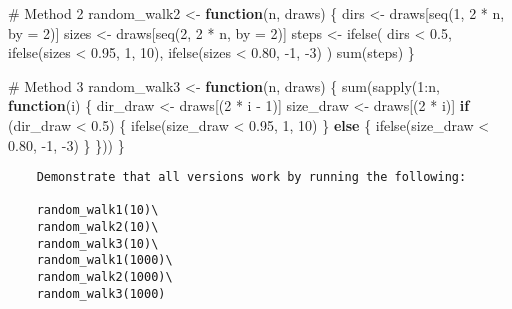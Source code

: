 \documentclass[
  letterpaper,
  DIV=11,
  numbers=noendperiod]{scrartcl}
\newenvironment{Shaded}{\begin{snugshade}}{\end{snugshade}}
\newcommand{\AttributeTok}[1]{\textcolor[rgb]{0.40,0.45,0.13}{#1}}
\newcommand{\CommentTok}[1]{\textcolor[rgb]{0.37,0.37,0.37}{#1}}
\newcommand{\ControlFlowTok}[1]{\textcolor[rgb]{0.00,0.23,0.31}{\textbf{#1}}}
\newcommand{\DecValTok}[1]{\textcolor[rgb]{0.68,0.00,0.00}{#1}}
\newcommand{\FloatTok}[1]{\textcolor[rgb]{0.68,0.00,0.00}{#1}}
\newcommand{\FunctionTok}[1]{\textcolor[rgb]{0.28,0.35,0.67}{#1}}
\newcommand{\NormalTok}[1]{\textcolor[rgb]{0.00,0.23,0.31}{#1}}
\newcommand{\OtherTok}[1]{\textcolor[rgb]{0.00,0.23,0.31}{#1}}
\newcommand{\SpecialCharTok}[1]{\textcolor[rgb]{0.37,0.37,0.37}{#1}}
\begin{document}
\begin{Shaded}
\begin{Highlighting}[]
\CommentTok{\# Method 2}
\NormalTok{random\_walk2 }\OtherTok{\textless{}{-}} \ControlFlowTok{function}\NormalTok{(n, draws) \{}
\NormalTok{  dirs }\OtherTok{\textless{}{-}}\NormalTok{ draws[}\FunctionTok{seq}\NormalTok{(}\DecValTok{1}\NormalTok{, }\DecValTok{2} \SpecialCharTok{*}\NormalTok{ n, }\AttributeTok{by =} \DecValTok{2}\NormalTok{)]}
\NormalTok{  sizes }\OtherTok{\textless{}{-}}\NormalTok{ draws[}\FunctionTok{seq}\NormalTok{(}\DecValTok{2}\NormalTok{, }\DecValTok{2} \SpecialCharTok{*}\NormalTok{ n, }\AttributeTok{by =} \DecValTok{2}\NormalTok{)]}
\NormalTok{  steps }\OtherTok{\textless{}{-}} \FunctionTok{ifelse}\NormalTok{(}
\NormalTok{    dirs }\SpecialCharTok{\textless{}} \FloatTok{0.5}\NormalTok{,}
    \FunctionTok{ifelse}\NormalTok{(sizes }\SpecialCharTok{\textless{}} \FloatTok{0.95}\NormalTok{, }\DecValTok{1}\NormalTok{, }\DecValTok{10}\NormalTok{),}
    \FunctionTok{ifelse}\NormalTok{(sizes }\SpecialCharTok{\textless{}} \FloatTok{0.80}\NormalTok{, }\SpecialCharTok{{-}}\DecValTok{1}\NormalTok{, }\SpecialCharTok{{-}}\DecValTok{3}\NormalTok{)}
\NormalTok{  )}
  \FunctionTok{sum}\NormalTok{(steps)}
\NormalTok{\}}

\CommentTok{\# Method 3}
\NormalTok{random\_walk3 }\OtherTok{\textless{}{-}} \ControlFlowTok{function}\NormalTok{(n, draws) \{}
  \FunctionTok{sum}\NormalTok{(}\FunctionTok{sapply}\NormalTok{(}\DecValTok{1}\SpecialCharTok{:}\NormalTok{n, }\ControlFlowTok{function}\NormalTok{(i) \{}
\NormalTok{    dir\_draw }\OtherTok{\textless{}{-}}\NormalTok{ draws[(}\DecValTok{2} \SpecialCharTok{*}\NormalTok{ i }\SpecialCharTok{{-}} \DecValTok{1}\NormalTok{)]}
\NormalTok{    size\_draw }\OtherTok{\textless{}{-}}\NormalTok{ draws[(}\DecValTok{2} \SpecialCharTok{*}\NormalTok{ i)]}
    \ControlFlowTok{if}\NormalTok{ (dir\_draw }\SpecialCharTok{\textless{}} \FloatTok{0.5}\NormalTok{) \{}
      \FunctionTok{ifelse}\NormalTok{(size\_draw }\SpecialCharTok{\textless{}} \FloatTok{0.95}\NormalTok{, }\DecValTok{1}\NormalTok{, }\DecValTok{10}\NormalTok{)}
\NormalTok{    \} }\ControlFlowTok{else}\NormalTok{ \{}
      \FunctionTok{ifelse}\NormalTok{(size\_draw }\SpecialCharTok{\textless{}} \FloatTok{0.80}\NormalTok{, }\SpecialCharTok{{-}}\DecValTok{1}\NormalTok{, }\SpecialCharTok{{-}}\DecValTok{3}\NormalTok{)}
\NormalTok{    \}}
\NormalTok{  \}))}
\NormalTok{\}}
\end{Highlighting}
\end{Shaded}

\begin{verbatim}
    Demonstrate that all versions work by running the following:

    random_walk1(10)\
    random_walk2(10)\
    random_walk3(10)\
    random_walk1(1000)\
    random_walk2(1000)\
    random_walk3(1000)
\end{verbatim}
\end{document}
